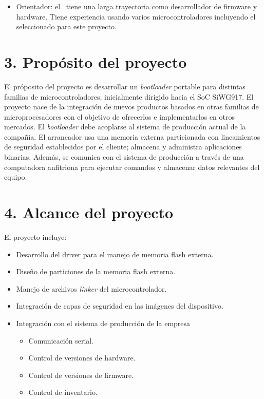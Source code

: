 \documentclass[
11pt, %
]{charter}
\begin{document}
\begin{itemize}
	\item Orientador: el \supname\  tiene una larga trayectoria como desarrollador de firmware y hardware. Tiene experiencia usando varios microcontroladores incluyendo el seleccionado para este proyecto.
\end{itemize}

\section{3. Propósito del proyecto}
\label{sec:proposito}


El próposito del proyecto es desarrollar un \textit{bootloader} portable para distintas familias de microcontroladores, inicialmente dirigido hacia el SoC SiWG917. El proyecto nace de la integración de nuevos productos basados en otras familias de microprocesadores con el objetivo de ofrecerlos e implementarlos en otros mercados. El \textit{bootloader} debe acoplarse al sistema de producción actual de la compañía. El arrancador usa una memoria externa particionada con lineamientos de seguridad establecidos por el cliente; almacena y administra aplicaciones binarias. Además, se comunica con el sistema de producción a través de una computadora anfitriona para ejecutar comandos y almacenar datos relevantes del equipo. 

\section{4. Alcance del proyecto}
\label{sec:alcance}

El proyecto incluye:
\begin{itemize}
	\item Desarrollo del driver para el manejo de memoria flash externa.
	\item Diseño de particiones de la memoria flash externa.
	\item Manejo de archivos \textit{linker} del microcontrolador.
	\item Integración de capas de seguridad en las imágenes del dispositivo.
	\item Integración con el sistema de producción de la empresa
		\begin{itemize}
		\item Comunicación serial.
		\item Control de versiones de hardware.
		\item Control de versiones de firmware.
		\item Control de inventario.
		\end{itemize}	
\end{itemize}
\end{document}
